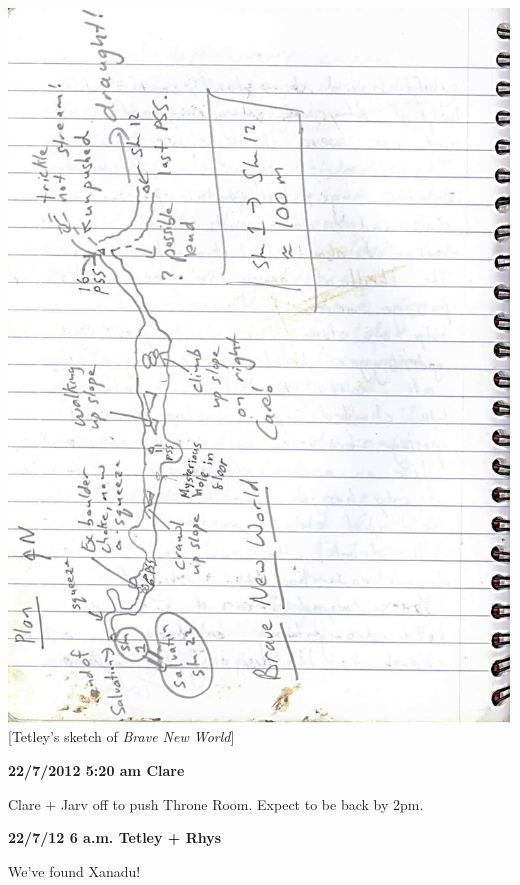 \includegraphics{UgLog1012/66.jpeg}{[}Tetley's sketch of \emph{Brave New
World}{]}

\textbf{22/7/2012 5:20 am Clare}

Clare + Jarv off to push Throne Room. Expect to be back by 2pm.

\textbf{22/7/12 6 a.m. Tetley + Rhys}

We've found Xanadu!

